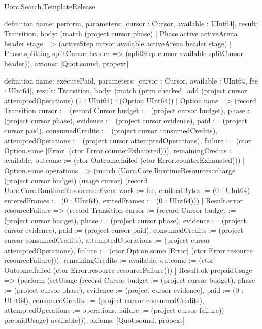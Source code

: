 \begin{lexlean}{Uorc.Search.TemplateRelease}
\begin{semanticmodule}
definition{
  name: perform,
  parameters: [cursor : Cursor, available : UInt64],
  result: Transition,
  body: (match (project cursor phase)
    | Phase.active activeArena header stage => (activeStep cursor available activeArena header stage)
    | Phase.splitting splitCursor header => (splitStep cursor available splitCursor header)),
  axioms: [Quot.sound, propext]
}

definition{
  name: executePaid,
  parameters: [cursor : Cursor, available : UInt64, fee : UInt64],
  result: Transition,
  body: (match (prim checked_add (project cursor attemptedOperations) (1 : UInt64) : (Option UInt64))
    | Option.none => (record Transition {cursor := (record Cursor {budget := (project cursor budget), phase := (project cursor phase), evidence := (project cursor evidence), paid := (project cursor paid), consumedCredits := (project cursor consumedCredits), attemptedOperations := (project cursor attemptedOperations), failure := (ctor Option.some [Error] (ctor Error.counterExhausted))}), remainingCredits := available, outcome := (ctor Outcome.failed (ctor Error.counterExhausted))})
    | Option.some operations => (match (Uorc.Core.RuntimeResources::charge (project cursor budget) (usage cursor) (record Uorc.Core.RuntimeResources::Event {work := fee, emittedBytes := (0 : UInt64), enteredFrames := (0 : UInt64), exitedFrames := (0 : UInt64)}))
      | Result.error resourceFailure => (record Transition {cursor := (record Cursor {budget := (project cursor budget), phase := (project cursor phase), evidence := (project cursor evidence), paid := (project cursor paid), consumedCredits := (project cursor consumedCredits), attemptedOperations := (project cursor attemptedOperations), failure := (ctor Option.some [Error] (ctor Error.resource resourceFailure))}), remainingCredits := available, outcome := (ctor Outcome.failed (ctor Error.resource resourceFailure))})
      | Result.ok prepaidUsage => (perform (setUsage (record Cursor {budget := (project cursor budget), phase := (project cursor phase), evidence := (project cursor evidence), paid := (0 : UInt64), consumedCredits := (project cursor consumedCredits), attemptedOperations := operations, failure := (project cursor failure)}) prepaidUsage) available))),
  axioms: [Quot.sound, propext]
}


\end{semanticmodule}
\end{lexlean}
